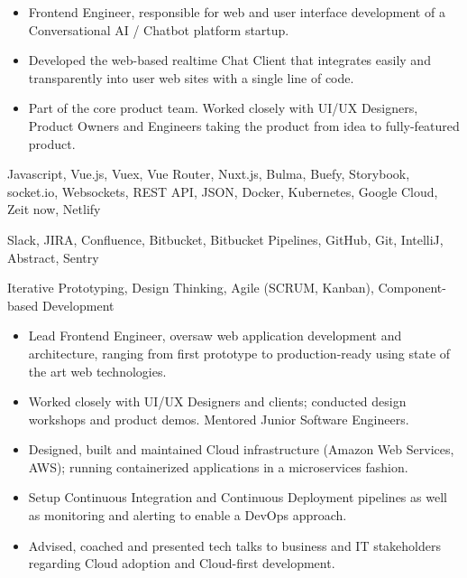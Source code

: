 
\medskip
\begin{itemize}
	\item Frontend Engineer, responsible for web and user interface development of a Conversational AI / Chatbot platform startup.
	\item Developed the web-based realtime Chat Client that integrates easily and transparently into user web sites with a single line of code.
	\item Part of the core product team. Worked closely with UI/UX Designers, Product Owners and Engineers taking the product from idea to fully-featured product.
\end{itemize}

\medskip
\begin{description}
	\ifincludestech
	\item [Technologies] Javascript, Vue.js, Vuex, Vue Router, Nuxt.js, Bulma, Buefy, Storybook, socket.io, Websockets, REST API, JSON, Docker, Kubernetes, Google Cloud, Zeit now, Netlify
	\fi
	\ifincludestools
	\item [Tools] Slack, JIRA, Confluence, Bitbucket, Bitbucket Pipelines, GitHub, Git, IntelliJ, Abstract, Sentry
	\fi
	\ifincludesmethods
	\item [Methodologies] Iterative Prototyping, Design Thinking, Agile (SCRUM, Kanban), Component-based Development	\fi
\end{description}

\divider



\medskip
\begin{itemize}
	\item Lead Frontend Engineer, oversaw web application development and architecture, ranging from first prototype to production-ready using state of the art web technologies.
	\item Worked closely with UI/UX Designers and clients; conducted design workshops and product demos. Mentored Junior Software Engineers.
	\item Designed, built and maintained Cloud infrastructure (Amazon Web Services, AWS); running containerized applications in a microservices fashion.
	\item Setup Continuous Integration and Continuous Deployment pipelines as well as monitoring and alerting to enable a DevOps approach.
	\item Advised, coached and presented tech talks to business and IT stakeholders regarding Cloud adoption and Cloud-first development.
\end{itemize}


